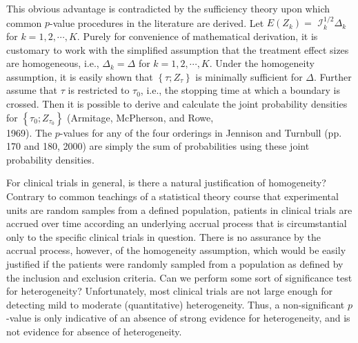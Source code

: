 \documentclass[10pt]{article}
\begin{document}
This obvious advantage is contradicted by the sufficiency theory upon which common $p$-value procedures in the literature are derived. Let $E\left(Z_{k}\right)=$ $\mathcal{I}_{k}^{1 / 2} \Delta_{k}$ for $k=1,2, \cdots, K$. Purely for convenience of mathematical derivation, it is customary to work with the simplified assumption that the treatment effect sizes are homogeneous, i.e., $\Delta_{k}=\Delta$ for $k=1,2, \cdots, K$. Under the homogeneity assumption, it is easily shown that $\left\{\tau ; Z_{\tau}\right\}$ is minimally sufficient for $\Delta$. Further assume that $\tau$ is restricted to $\tau_{0}$, i.e., the stopping time at which a boundary is crossed. Then it is possible to derive and calculate the joint probability densities for $\left\{\tau_{0} ; Z_{\tau_{0}}\right\}$ (Armitage, McPherson, and Rowe,\\
1969). The $p$-values for any of the four orderings in Jennison and Turnbull (pp. 170 and 180, 2000) are simply the sum of probabilities using these joint probability densities.

For clinical trials in general, is there a natural justification of homogeneity? Contrary to common teachings of a statistical theory course that experimental units are random samples from a defined population, patients in clinical trials are accrued over time according an underlying accrual process that is circumstantial only to the specific clinical trials in question. There is no assurance by the accrual process, however, of the homogeneity assumption, which would be easily justified if the patients were randomly sampled from a population as defined by the inclusion and exclusion criteria. Can we perform some sort of significance test for heterogeneity? Unfortunately, most clinical trials are not large enough for detecting mild to moderate (quantitative) heterogeneity. Thus, a non-significant $p$-value is only indicative of an absence of strong evidence for heterogeneity, and is not evidence for absence of heterogeneity.
\end{document}
